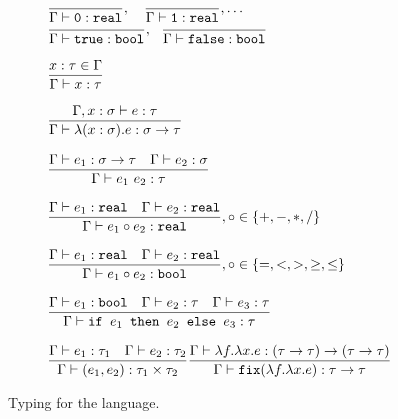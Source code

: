 \begin{figure}
\[
\begin{array}{lr}
\dfrac{}{\Gamma \vdash \texttt{0}: \texttt{real}}, \quad \dfrac{}{\Gamma \vdash \texttt{1}: \texttt{real}}, \ldots \\
\dfrac{}{\Gamma \vdash \texttt{true} : \texttt{bool}}, \ \ \dfrac{}{\Gamma \vdash \texttt{false} : \texttt{bool}} \\ \\
\dfrac{x : \tau \in \Gamma}{\Gamma \vdash x : \tau } \\ \\
\dfrac{\Gamma, x : \sigma \vdash e : \tau}{\Gamma \vdash \lambda (x : \sigma).e : \sigma \rightarrow \tau } \\ \\ 
\dfrac{\Gamma \vdash e_1: \sigma \rightarrow \tau \ \ \ \Gamma \vdash e_2 : \sigma}{\Gamma \vdash e_1 \ e_2 : \tau} \\ \\ 
\dfrac{\Gamma \vdash e_1 : \texttt{real} \ \ \ \Gamma \vdash e_2 : \texttt{real}}{\Gamma \vdash e_1 \circ e_2 : \texttt{real}}
, \circ \in \{+,-,*,/\} \\ \\ 
\dfrac{\Gamma \vdash e_1 : \texttt{real} \ \ \ \Gamma \vdash e_2 : \texttt{real}}{\Gamma \vdash e_1 \circ e_2 : \texttt{bool}}
, \circ \in \{=, <, >, \geq, \leq\} \\ \\ 
\dfrac{\Gamma \vdash e_1 : \texttt{bool} \ \ \ \Gamma \vdash e_2 : \tau \ \ \ \Gamma \vdash e_3 : \tau}
{\Gamma \vdash \ifelse{e_1}{e_2}{e_3} : \tau} \\ \\ 
\dfrac{\Gamma \vdash e_1 : \tau_1 \ \ \ \Gamma \vdash e_2: \tau_2}{\Gamma \vdash (e_1, e_2) : \tau_1 \times \tau_2}
\dfrac{\Gamma \vdash \lambda f. \lambda x.e : (\tau \rightarrow \tau) \rightarrow (\tau \rightarrow \tau)}
{\Gamma \vdash \texttt{fix}(\lambda f. \lambda x.e) : \tau \rightarrow \tau} 
\end{array}
\]
\caption{Typing for the language.}
\label{fig:typing}
\end{figure}

